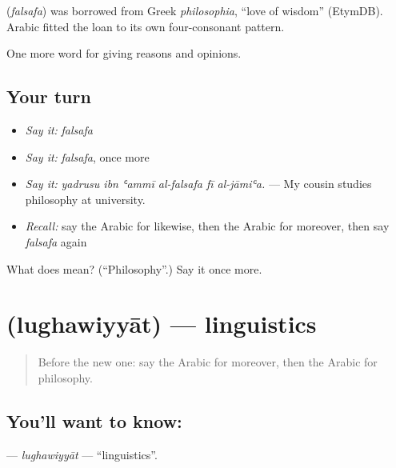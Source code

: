 \begin{cousinweb}
\textbf{} (\emph{falsafa}) was borrowed from Greek \emph{philosophia}, \textquotedblleft{}love of wisdom\textquotedblright{} (EtymDB). Arabic fitted the loan to its own four-consonant pattern.
\end{cousinweb}

\begin{grammarlens}[title={What you've built}]
One more word for giving reasons and opinions.
\end{grammarlens}

\subsection*{Your turn}
\begin{itemize}
\raggedright
  \item \emph{Say it:} \emph{falsafa}
  \item \emph{Say it:} \emph{falsafa}, once more
  \item \emph{Say it:} \emph{yadrusu ibn ʿammī al-falsafa fī al-jāmiʿa.} — My cousin studies philosophy at university.
  \item \emph{Recall:} say the Arabic for likewise, then the Arabic for moreover, then say \emph{falsafa} again
\end{itemize}

\begin{tcolorbox}[breakable,colback=teal!4,colframe=teal!35!black,title={Before you move on}]
What does  mean? (\textquotedblleft{}Philosophy\textquotedblright{}.) Say it once more.
\end{tcolorbox}
\section[\texorpdfstring{\ar{لغويات} (lughawiyyāt)}{لغويات (lughawiyyāt)}]{ (lughawiyyāt) — linguistics}

\label{lesson:AR-C376-lughawiyyat}



\begin{quote}
Before the new one: say the Arabic for moreover, then the Arabic for philosophy.
\end{quote}

\subsection*{You'll want to know: }
\textbf{} — \emph{lughawiyyāt} — \textquotedblleft{}linguistics\textquotedblright{}.

